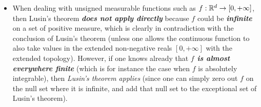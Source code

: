 \documentclass[11pt]{article}
\begin{document}
\begin{itemize}
\item \begin{remark}
When dealing with unsigned measurable functions such as $f : {\mathbb R}^d \rightarrow [0,+\infty]$, then Lusin's theorem \emph{\textbf{does not apply directly}} because $f$ could be \emph{\textbf{infinite}} on a set of positive measure, which is clearly in contradiction with the conclusion of Lusin's theorem (unless one allows the continuous function to also take values in the extended non-negative reals $[0,+\infty]$ with the extended topology). However, if one knows already that \emph{\textbf{$f$ is almost everywhere finite}} (which is for instance the case when $f$ is absolutely integrable), then \emph{Lusin's theorem applies} (since one can simply zero out $f$ on the null set where it is infinite, and add that null set to the exceptional set of Lusin's theorem).
\end{remark}
\end{itemize}
\end{document}
